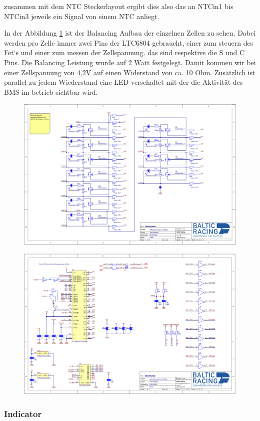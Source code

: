 zusammen mit dem NTC Steckerlayout ergibt dies also das an NTCin1 bis NTCin3 jeweils ein Signal von einem NTC anliegt.

In der Abbildung \ref{fig:amsbalancingschematic} ist der Balancing Aufbau der einzelnen Zellen zu sehen. Dabei werden pro Zelle immer zwei Pins der LTC6804 gebraucht, einer zum steuern des Fet`s und einer zum messen der Zellspannung. das sind respektive die S und C Pins. Die Balancing Leistung wurde auf 2 Watt festgelegt. Damit kommen wir bei einer Zellspannung von 4,2V auf einen Widerstand von ca. 10 Ohm. Zusätzlich ist parallel zu jedem Wiederstand eine LED verschaltet mit der die Aktivität des BMS im betrieb sichtbar wird.

\begin{figure}
	\centering
	\includegraphics[width=0.7\linewidth]{bilder/AMS_Balancing_Schematic}
	\caption{}
	\label{fig:amsbalancingschematic}
\end{figure}


\begin{figure}
	\centering
	\includegraphics[width=0.7\linewidth]{bilder/AMS_slave_controller_schematic}
	\caption{}
	\label{fig:amsslavecontrollerschematic}
\end{figure}

\FloatBarrier
\subsubsection{ Indicator}

